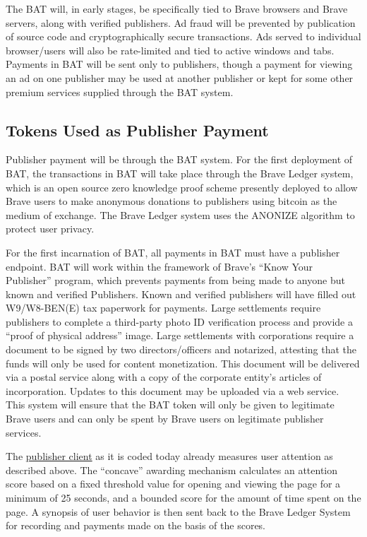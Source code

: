 \documentclass[11pt]{article}
\begin{document}
The BAT will, in early stages, be specifically tied to Brave browsers and Brave servers, along with verified publishers. Ad fraud will be prevented by publication of source code and cryptographically secure transactions. Ads served to individual browser/users will also be rate-limited and tied to active windows and tabs. Payments in BAT will be sent only to publishers, though a payment for viewing an ad on one publisher may be used at another publisher or kept for some other premium services supplied through the BAT system.

\subsection{Tokens Used as Publisher Payment}
\label{sec-4-3}

Publisher payment will be through the BAT system. For the first deployment of BAT, the transactions in BAT will take place through the Brave Ledger system, which is an open source zero knowledge proof scheme presently deployed to allow Brave users to make anonymous donations to publishers using bitcoin as the medium of exchange.  The Brave Ledger system uses the ANONIZE\cite{13} algorithm to protect user privacy. 

For the first incarnation of BAT, all payments in BAT must have a publisher endpoint. BAT will work within the framework of Brave’s ``Know Your Publisher'' program, which prevents payments from being made to anyone but known and verified Publishers. Known and verified publishers will have filled out W9/W8-BEN(E) tax paperwork for payments. Large settlements require publishers to complete a third-party photo ID verification process and provide a ``proof of physical address'' image. Large settlements with corporations require a document to be signed by two directors/officers and notarized, attesting that the funds will only be used for content monetization. This document will be delivered via a postal service along with a copy of the corporate entity’s articles of incorporation. Updates to this document may be uploaded via a web service. This system will ensure that the BAT token will only be given to legitimate Brave users and can only be spent by Brave users on legitimate publisher services.

The \href{https://github.com/brave/ledger-publisher}{publisher client} as it is coded today already measures user attention as described above. The “concave” awarding mechanism calculates an attention score based on a fixed threshold value for opening and viewing the page for a minimum of 25 seconds, and a bounded score for the amount of time spent on the page. A synopsis of user behavior is then sent back to the Brave Ledger System for recording and payments made on the basis of the scores.
\end{document}
